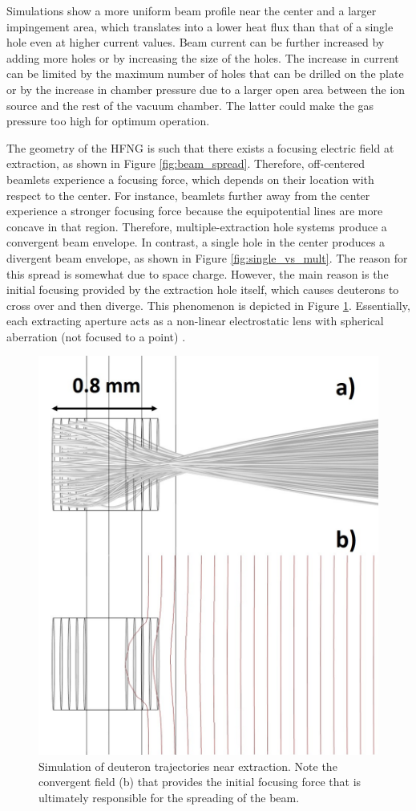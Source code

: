 \documentclass[review]{elsarticle}
\begin{document}
Simulations show a more uniform beam profile near the center and a larger impingement area, which translates into a lower heat flux than that of a single hole even at higher current values. Beam current can be further increased by adding more holes or by increasing the size of the holes. The increase in current can be limited by the maximum number of holes that can be drilled on the plate or by the increase in chamber pressure due to a larger open area between the ion source and the rest of the vacuum chamber. The latter could make the gas pressure too high for optimum operation. 

The geometry of the HFNG is such that there exists a focusing electric field at extraction, as shown in Figure \ref{fig:beam_spread}. Therefore, off-centered beamlets experience a focusing force, which depends on their location with respect to the center. For instance, beamlets further away from the center experience a stronger focusing force because the equipotential lines are more concave in that region. Therefore, multiple-extraction hole systems produce a convergent beam envelope. In contrast, a single hole in the center produces a divergent beam envelope, as shown in Figure \ref{fig:single_vs_mult}. The reason for this spread is somewhat due to space charge. However, the main reason is the initial focusing provided by the extraction hole itself, which causes deuterons to cross over and then diverge. This phenomenon is depicted in Figure \ref{fig:cross_over}. Essentially, each extracting aperture acts as a non-linear electrostatic lens with spherical aberration (not focused to a point) \cite{Plasma}. 

\begin{figure}
	\centering
	\includegraphics[height=0.6\textwidth]{pics/cross_over_comp}
	\caption{Simulation of deuteron trajectories near extraction. Note the convergent field (b) that provides the initial focusing force that is ultimately responsible for the spreading of the beam.}
	\label{fig:cross_over}
\end{figure}
\end{document}
